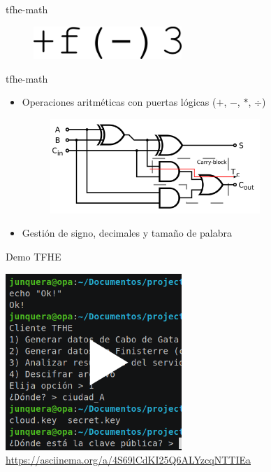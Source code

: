 \documentclass{beamer}
\begin{document}
\begin{frame}{tfhe-math}

    \begin{figure}[H]
        \centering\includegraphics[width=0.5\textwidth]{logo-tfhe-math}
    \end{figure}
\end{frame}


\begin{frame}{tfhe-math}
    \begin{itemize}
        
        \item Operaciones aritméticas con puertas lógicas ($+$, $-$, $*$, $\div$)
        
        \begin{figure}[H]
            \centering\includegraphics[width=0.75\textwidth]{adder_digital_circuit}
        \end{figure}
        
        \item Gestión de signo, decimales y tamaño de palabra
        
    \end{itemize}
\end{frame}

\begin{frame}{Demo TFHE}

    \href{https://asciinema.org/a/4S69lCdKI25Q6ALYzcqNTTIEa}{
        \centering\includegraphics[width=0.5\textwidth]{tfhe-cs}
    }
    \centering\url{https://asciinema.org/a/4S69lCdKI25Q6ALYzcqNTTIEa}

\end{frame}
\end{document}
